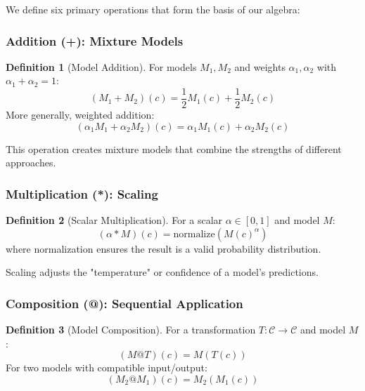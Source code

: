 \documentclass{article}
\theoremstyle{definition}
\newtheorem{definition}{Definition}
\begin{document}
We define six primary operations that form the basis of our algebra:

\subsubsection{Addition (+): Mixture Models}

\begin{definition}[Model Addition]
For models $M_1, M_2$ and weights $\alpha_1, \alpha_2$ with $\alpha_1 + \alpha_2 = 1$:
\begin{equation}
(M_1 + M_2)(c) = \frac{1}{2}M_1(c) + \frac{1}{2}M_2(c)
\end{equation}
More generally, weighted addition:
\begin{equation}
(\alpha_1 M_1 + \alpha_2 M_2)(c) = \alpha_1 M_1(c) + \alpha_2 M_2(c)
\end{equation}
\end{definition}

This operation creates mixture models that combine the strengths of different approaches.

\subsubsection{Multiplication (*): Scaling}

\begin{definition}[Scalar Multiplication]
For a scalar $\alpha \in [0, 1]$ and model $M$:
\begin{equation}
(\alpha * M)(c) = \text{normalize}(M(c)^\alpha)
\end{equation}
where normalization ensures the result is a valid probability distribution.
\end{definition}

Scaling adjusts the "temperature" or confidence of a model's predictions.

\subsubsection{Composition (@): Sequential Application}

\begin{definition}[Model Composition]
For a transformation $T: \mathcal{C} \rightarrow \mathcal{C}$ and model $M$:
\begin{equation}
(M @ T)(c) = M(T(c))
\end{equation}
For two models with compatible input/output:
\begin{equation}
(M_2 @ M_1)(c) = M_2(M_1(c))
\end{equation}
\end{definition}
\end{document}
